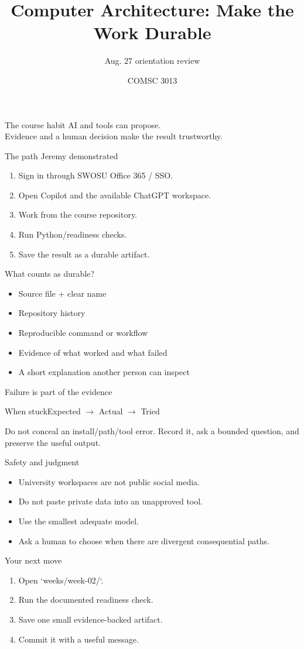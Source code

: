 \documentclass[aspectratio=169,10pt]{beamer}
\title{Computer Architecture: Make the Work Durable}
\subtitle{Aug. 27 orientation review}
\author{COMSC 3013}
\date{}
\begin{document}
\frame{\titlepage}
\begin{frame}{The course habit}{\Large\centering
AI and tools can propose.\\[.4em]
Evidence and a human decision make the result trustworthy.}
\end{frame}
\begin{frame}{The path Jeremy demonstrated}
\begin{enumerate}\item Sign in through SWOSU Office 365 / SSO.\item Open Copilot and the available ChatGPT workspace.\item Work from the course repository.\item Run Python/readiness checks.\item Save the result as a durable artifact.\end{enumerate}
\end{frame}
\begin{frame}{What counts as durable?}
\begin{itemize}\item Source file + clear name\item Repository history\item Reproducible command or workflow\item Evidence of what worked and what failed\item A short explanation another person can inspect\end{itemize}
\end{frame}
\begin{frame}{Failure is part of the evidence}
\begin{block}{When stuck}Expected $\rightarrow$ Actual $\rightarrow$ Tried\end{block}
Do not conceal an install/path/tool error. Record it, ask a bounded question, and preserve the useful output.
\end{frame}
\begin{frame}{Safety and judgment}
\begin{itemize}\item University workspaces are not public social media.\item Do not paste private data into an unapproved tool.\item Use the smallest adequate model.\item Ask a human to choose when there are divergent consequential paths.\end{itemize}
\end{frame}
\begin{frame}{Your next move}
\begin{enumerate}\item Open `weeks/week-02/`.\item Run the documented readiness check.\item Save one small evidence-backed artifact.\item Commit it with a useful message.\end{enumerate}
\end{frame}
\end{document}
